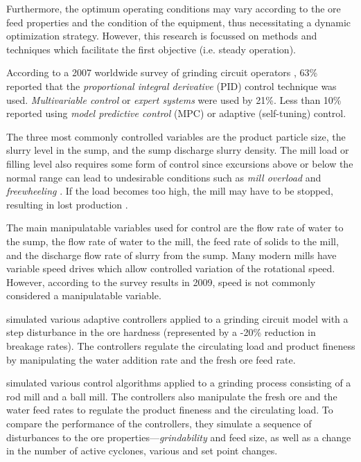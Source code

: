 Furthermore, the optimum operating conditions may vary according to the ore feed properties and the condition of the equipment, thus necessitating a dynamic optimization strategy. However, this research is focussed on methods and techniques which facilitate the first objective (i.e. steady operation).

According to a 2007 worldwide survey of grinding circuit operators \citep{wei_grinding_2009}, 63\% reported that the \textit{proportional integral derivative} (PID) control technique was used. \textit{Multivariable control} or \textit{expert systems} were used by 21\%. Less than 10\% reported using \textit{model predictive control} (MPC) or adaptive (self-tuning) control.

The three most commonly controlled variables are the product particle size, the slurry level in the sump, and the sump discharge slurry density. The mill load or filling level also requires some form of control since excursions above or below the normal range can lead to undesirable conditions such as \textit{mill overload} and \textit{freewheeling} \citep{mcclure_overload_2015}. If the load becomes too high, the mill may have to be stopped, resulting in lost production \citep{wei_grinding_2009}.

The main manipulatable variables used for control are the flow rate of water to the sump, the flow rate of water to the mill, the feed rate of solids to the mill, and the discharge flow rate of slurry from the sump. Many modern mills have variable speed drives which allow controlled variation of the rotational speed. However, according to the survey results in 2009, speed is not commonly considered a manipulatable variable.

\cite{najim_adaptive_1995} simulated various adaptive controllers applied to a grinding circuit model with a step disturbance in the ore hardness (represented by a -20\% reduction in breakage rates). The controllers regulate the circulating load and product fineness by manipulating the water addition rate and the fresh ore feed rate.

\cite{pomerleau_survey_2000} simulated various control algorithms applied to a grinding process consisting of a rod mill and a ball mill. The controllers also manipulate the fresh ore and the water feed rates to regulate the product fineness and the circulating load. To compare the performance of the controllers, they simulate a sequence of disturbances to the ore properties---\textit{grindability} and feed size, as well as a change in the number of active cyclones, various and set point changes.

